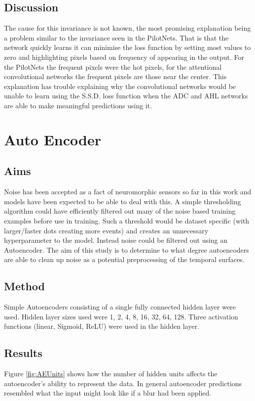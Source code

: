 \subsection{Discussion}
The cause for this invariance is not known, the most promising explanation being a problem similar to the invariance seen in the PilotNets.
That is that the network quickly learns it can minimise the loss function by setting most values to zero and highlighting pixels based on frequency of appearing in the output.
For the PilotNets the frequent pixels were the hot pixels, for the attentional convolutional networks the frequent pixels are those near the center.
This explanation has trouble explaining why the convolutional networks would be unable to learn using the S.S.D. loss function when the ADC and AHL networks are able to make meaningful predictions using it.  

\section{Auto Encoder}
\subsection{Aims}
Noise has been accepted as a fact of neuromorphic sensors so far in this work and models have been expected to be able to deal with this.
A simple thresholding algorithm could have efficiently filtered out many of the noise based training examples before use in training. 
Such a threshold would be dataset specific (with larger/faster dots creating more events) and creates an unnecessary hyperparameter to the model. 
Instead noise could be filtered out using an Autoencoder.
The aim of this study is to determine to what degree autoencoders are able to clean up noise as a potential preprocessing of the temporal surfaces.

\subsection{Method}
Simple Autoencoders consisting of a single fully connected hidden layer were used.
Hidden layer sizes used were 1, 2, 4, 8, 16, 32, 64, 128. 
Three activation functions (linear, Sigmoid, ReLU) were used in the hidden layer.   

\subsection{Results}
Figure \ref{fig:AEUnits} shows how the number of hidden units affects the autoencoder's ability to represent the data. 
In general autoencoder predictions resembled what the input might look like if a blur had been applied. 

